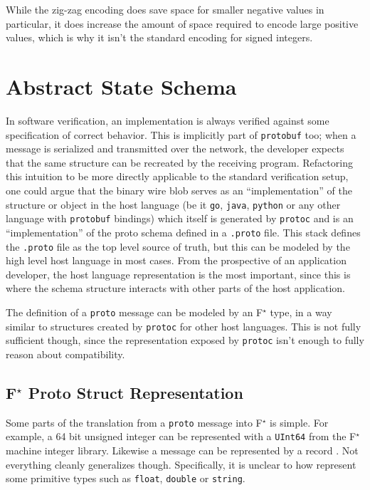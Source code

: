 \documentclass[11pt]{article}
\newcommand{\fstar}{F\(^\star\)}
\theoremstyle{definition}
\begin{document}
While the zig-zag encoding does save space for smaller negative values in
particular, it does increase the amount of space required to encode large
positive values, which is why it isn't the standard encoding for signed
integers. 

\section{Abstract State Schema}

In software verification, an implementation is always verified against some
specification of correct behavior. This is implicitly part of
\texttt{protobuf} too; when a message is serialized and transmitted over the
network, the developer expects that the same structure can be recreated by the
receiving program. Refactoring this intuition to be more directly applicable to
the standard verification setup, one could argue that the binary wire blob
serves as an ``implementation'' of the structure or object in the host
language (be it \texttt{go}, \texttt{java}, \texttt{python} or any other
language with \texttt{protobuf} bindings) which itself is generated by
\texttt{protoc} and is an ``implementation'' of the proto schema defined in a
\texttt{.proto} file. This stack defines the \texttt{.proto} file as the top
level source of truth, but this can be modeled by the high level host language
in most cases. From the prospective of an application developer, the host
language representation is the most important, since this is where the schema
structure interacts with other parts of the host application.

The definition of a \texttt{proto} message can be modeled by an \fstar{} type,
in a way similar to structures created by \texttt{protoc} for other host
languages. This is not fully sufficient though, since the representation
exposed by \texttt{protoc} isn't enough to fully reason about compatibility.

\subsection{\fstar{} Proto Struct Representation}

Some parts of the translation from a \texttt{proto} message
\autocite{LanguageGuideProto} into \fstar{} is simple. For example, a 64 bit
unsigned integer can be represented with a \texttt{UInt64} from the \fstar{}
machine integer library. Likewise a message can be represented by a record
\autocite{swamy2023proof}. Not everything cleanly generalizes
though. Specifically, it is unclear to how represent some primitive types such
as \texttt{float}, \texttt{double} or \texttt{string}.
\end{document}
